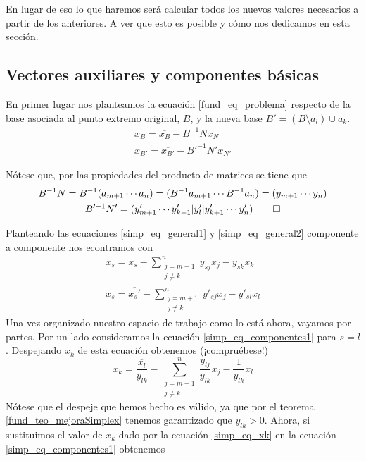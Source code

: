 En lugar de eso lo que haremos será calcular todos los nuevos valores necesarios a partir de los anteriores. A ver que esto es posible y cómo nos dedicamos en esta sección.
\subsection{Vectores auxiliares y componentes básicas}
En primer lugar nos planteamos la ecuación \eqref{fund_eq_problema} respecto de la base asociada al punto extremo original, $B$, y la nueva base $B'=(B\setminus a_l)\cup a_k$.
\begin{gather}
	x_B=\overline{x_B}-B^{-1}Nx_N\label{simp_eq_general1}\\
	x_{B'}=\overline{x_{B'}}-B'^{-1}N'x_{N'}\label{simp_eq_general2}
\end{gather}
\begin{obs}
	Nótese que, por las propiedades del producto de matrices se tiene que
	\begin{gather*}
		B^{-1}N=B^{-1}(a_{m+1}\cdots a_n)=(B^{-1}a_{m+1}\cdots B^{-1}a_n)=(y_{m+1}\cdots y_n)\\
		B'^{-1}N'=(y'_{m+1}\cdots y'_{k-1}|y'_l|y'_{k+1}\cdots y'_n)\qedhere
	\end{gather*}
\end{obs}
Planteando las ecuaciones \eqref{simp_eq_general1} y \eqref{simp_eq_general2} componente a componente nos econtramos con
\begin{gather}
	x_s=\overline{x_s}-\sum_{\substack{j=m+1\\j\not=k}}^{n}y_{sj}x_j-y_{sk}x_k\label{simp_eq_componentes1}\\
	x_s=\overline{x_s'}-\sum_{\substack{j=m+1\\j\not=k}}^{n}y'_{sj}x_j-y'_{sl}x_l\label{simp_eq_componentes2}
\end{gather}
Una vez organizado nuestro espacio de trabajo como lo está ahora, vayamos por partes. Por un lado consideramos la ecuación \eqref{simp_eq_componentes1} para $s=l$. Despejando $x_k$ de esta ecuación obtenemos (¡compruébese!)
\begin{equation}
\label{simp_eq_xk}
	x_k=\frac{\overline{x_l}}{y_{lk}}-\sum_{\substack{j=m+1\\j\not=k}}^{n}\frac{y_{lj}}{y_{lk}}x_j-\frac{1}{y_{lk}}x_l
\end{equation}
Nótese que el despeje que hemos hecho es válido, ya que por el teorema \ref{fund_teo_mejoraSimplex} tenemos garantizado que $y_{lk}>0$. Ahora, si sustituimos el valor de $x_k$ dado por la ecuación \eqref{simp_eq_xk} en la ecuación \eqref{simp_eq_componentes1} obtenemos
